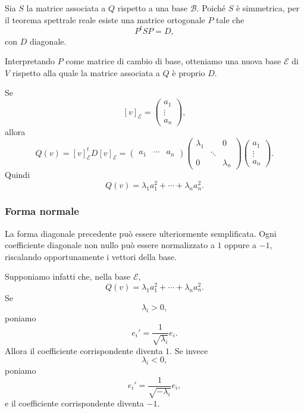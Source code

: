 \documentclass[a4paper]{article}
\begin{document}
\begin{snippetproof}{}
    Sia \(S\) la matrice associata a \(Q\) rispetto a una base \(\mathcal{B}\). Poiché \(S\) è simmetrica, per il teorema spettrale reale esiste una matrice ortogonale \(P\) tale che
    \[
        P^tSP=D,
    \]
    con \(D\) diagonale.

    Interpretando \(P\) come matrice di cambio di base, otteniamo una nuova base \(\mathcal{E}\) di \(V\) rispetto alla quale la matrice associata a \(Q\) è proprio \(D\).

    Se
    \[
        [v]_{\mathcal{E}}
        =
        \begin{pmatrix}
            a_1\\
            \vdots\\
            a_n
        \end{pmatrix},
    \]
    allora
    \[
        Q(v)
        =
        [v]_{\mathcal{E}}^t
        D
        [v]_{\mathcal{E}}
        =
        \begin{pmatrix}
            a_1 & \cdots & a_n
        \end{pmatrix}
        \begin{pmatrix}
            \lambda_1 & & 0\\
            & \ddots & \\
            0 & & \lambda_n
        \end{pmatrix}
        \begin{pmatrix}
            a_1\\
            \vdots\\
            a_n
        \end{pmatrix}.
    \]
    Quindi
    \[
        Q(v)=\lambda_1a_1^2+\cdots+\lambda_na_n^2.
    \]
\end{snippetproof}

\subsubsection{Forma normale}

La forma diagonale precedente può essere ulteriormente semplificata. Ogni coefficiente diagonale non nullo può essere normalizzato a \(1\) oppure a \(-1\), riscalando opportunamente i vettori della base.

Supponiamo infatti che, nella base \(\mathcal{E}\),
\[
    Q(v)=\lambda_1a_1^2+\cdots+\lambda_na_n^2.
\]
Se
\[
    \lambda_i>0,
\]
poniamo
\[
    e_i'=\frac{1}{\sqrt{\lambda_i}}e_i.
\]
Allora il coefficiente corrispondente diventa \(1\). Se invece
\[
    \lambda_i<0,
\]
poniamo
\[
    e_i'=\frac{1}{\sqrt{-\lambda_i}}e_i,
\]
e il coefficiente corrispondente diventa \(-1\).
\end{document}
